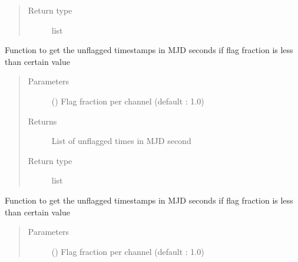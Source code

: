 \documentclass[letterpaper,10pt,english]{sphinxmanual}
\begin{document}
\begin{fulllineitems}
\begin{fulllineitems}
\begin{quote}
\begin{description}
\item[{Return type}] \leavevmode
\sphinxAtStartPar
list

\end{description}\end{quote}

\end{fulllineitems}


\begin{fulllineitems}
\label{\detokenize{paircars:paircars.access_ms.AccessMS.get_unflag_times_mjd}}
\sphinxAtStartPar
Function to get the unflagged timestamps in MJD seconds if flag fraction is less than certain value
\begin{quote}\begin{description}
\item[{Parameters}] \leavevmode
\sphinxAtStartPar
{} () \textendash{} Flag fraction per channel (default : 1.0)

\item[{Returns}] \leavevmode
\sphinxAtStartPar
List of unflagged times in MJD second

\item[{Return type}] \leavevmode
\sphinxAtStartPar
list

\end{description}\end{quote}

\end{fulllineitems}


\begin{fulllineitems}
\label{\detokenize{paircars:paircars.access_ms.AccessMS.get_unflag_timestamps}}
\sphinxAtStartPar
Function to get the unflagged timestamps in MJD seconds if flag fraction is less than certain value
\begin{quote}\begin{description}
\item[{Parameters}] \leavevmode
\sphinxAtStartPar
{} () \textendash{} Flag fraction per channel (default : 1.0)


\end{description}
\end{quote}
\end{fulllineitems}
\end{fulllineitems}
\end{document}
